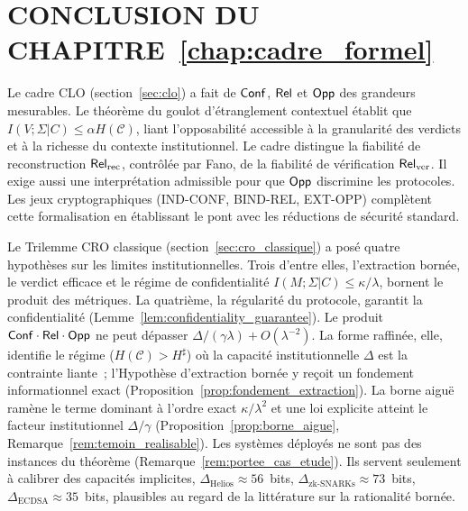 
\section{CONCLUSION DU CHAPITRE~\ref{chap:cadre_formel}}
\label{sec:conclusion_cadre_formel}

\begin{sloppypar}
Le cadre CLO (section~\ref{sec:clo}) a fait de $\mathsf{Conf}$, $\mathsf{Rel}$ et $\mathsf{Opp}$
des grandeurs mesurables. Le
th\'eor\`eme du goulot d'\'etranglement contextuel \'etablit que
$I(V;\Sigma|C) \leq \alpha H(\mathcal{C})$, liant l'opposabilit\'e
accessible \`a la granularit\'e des verdicts et \`a la richesse du contexte
institutionnel. Le cadre distingue la fiabilit\'e de reconstruction
$\mathsf{Rel}_{\mathrm{rec}}$, contr\^ol\'ee par Fano, de la fiabilit\'e de v\'erification
$\mathsf{Rel}_{\mathrm{ver}}$. Il exige aussi une interpr\'etation admissible pour que $\mathsf{Opp}$ discrimine
les protocoles. Les jeux cryptographiques (IND-CONF,
BIND-REL, EXT-OPP) compl\`etent cette formalisation en \'etablissant le pont
avec les r\'eductions de s\'ecurit\'e standard.

Le Trilemme CRO classique (section~\ref{sec:cro_classique}) a pos\'e
quatre hypoth\`eses sur les limites institutionnelles. Trois d'entre elles, l'extraction
born\'ee, le verdict efficace et le r\'egime de confidentialit\'e
$I(M;\Sigma|C) \leq \kappa/\lambda$, bornent le produit des m\'etriques. La quatri\`eme, la
r\'egularit\'e du protocole, garantit la confidentialit\'e
(Lemme~\ref{lem:confidentiality_guarantee}).
Le produit $\mathsf{Conf}\cdot\mathsf{Rel}\cdot\mathsf{Opp}$ ne peut
d\'epasser $\Delta/(\gamma\lambda) + O(\lambda^{-2})$. La forme raffin\'ee, elle,
identifie le r\'egime ($H(\mathcal{C}) > H^\sharp$) o\`u la capacit\'e
institutionnelle $\Delta$ est la contrainte liante~; l'Hypoth\`ese d'extraction
born\'ee y re\c{c}oit un fondement informationnel exact
(Proposition~\ref{prop:fondement_extraction}). La borne aigu\"e ram\`ene le terme
dominant \`a l'ordre exact $\kappa/\lambda^2$ et une loi explicite atteint le facteur
institutionnel $\Delta/\gamma$ (Proposition~\ref{prop:borne_aigue},
Remarque~\ref{rem:temoin_realisable}). Les syst\`emes d\'eploy\'es ne
sont pas des instances du th\'eor\`eme (Remarque~\ref{rem:portee_cas_etude}).
Ils servent seulement \`a calibrer des capacit\'es implicites,
$\Delta_{\text{Helios}} \approx 56$~bits,
$\Delta_{\text{zk-SNARKs}} \approx 73$~bits, $\Delta_{\text{ECDSA}}
\approx 35$~bits, plausibles au regard de la litt\'erature sur la
rationalit\'e born\'ee.


\end{sloppypar}
